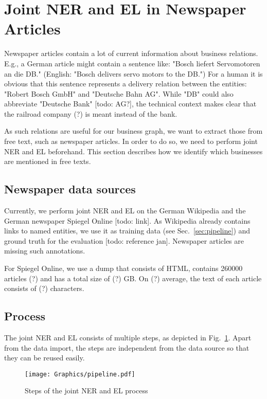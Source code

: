 \section{Joint NER and EL in Newspaper Articles}
\label{sec:ner_el}

Newspaper articles contain a lot of current information about business relations. E.g., a German article might contain a sentence like: "Bosch liefert Servomotoren an die DB." (English: "Bosch delivers servo motors to the DB.") For a human it is obvious that this sentence represents a delivery relation between the entities: "Robert Bosch GmbH" and "Deutsche Bahn AG". While "DB" could also abbreviate "Deutsche Bank" [todo: AG?], the technical context makes clear that the railroad company (?) is meant instead of the bank.

As such relations are useful for our business graph, we want to extract those from free text, such as newspaper articles. In order to do so, we need to perform joint NER and EL beforehand. This section describes how we identify which businesses are mentioned in free texts.\\

\subsection{Newspaper data sources}
Currently, we perform joint NER and EL on the German Wikipedia and the German newspaper Spiegel Online [todo: link]. As Wikipedia already contains links to named entities, we use it as training data (see Sec.~\ref{sec:pipeline}) and ground truth for the evaluation [todo: reference jan]. Newspaper articles are missing such annotations.

For Spiegel Online, we use a dump that consists of HTML, contains 260000 articles (?) and has a total size of (?) GB. On (?) average, the text of each article consists of (?) characters.\\

\subsection{Process}
The joint NER and EL consists of multiple steps, as depicted in Fig.~\ref{fig:ner_el_process}. Apart from the data import, the steps are independent from the data source so that they can be reused easily.

\begin{figure}[ht]
	\centering
  \texttt{[image: Graphics/pipeline.pdf]}
	\caption{Steps of the joint NER and EL process}
	\label{fig:ner_el_process}
\end{figure}

